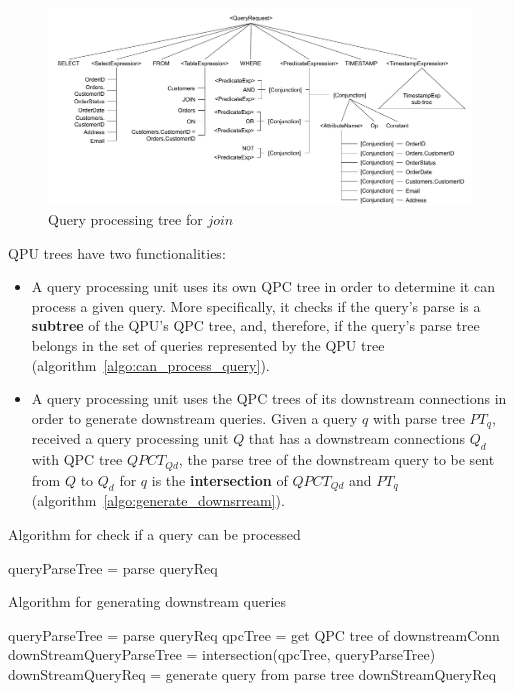 \begin{figure}[t]
  \centering
    \includegraphics[width=\textwidth]{./figures/design_pattern/qpt_join.pdf}
  \caption{Query processing tree for $join$}
  \label{fig:qpt_join}
\end{figure}

QPU trees have two functionalities:
\begin{itemize}
  \item A query processing unit uses its own QPC tree in order to determine it can process a given query.
  More specifically, it checks if the query's parse is a \textbf{subtree} of the QPU's QPC tree,
  and, therefore, if the query's parse tree belongs in the set of queries represented by the QPU tree
  (algorithm~\ref{algo:can_process_query}).

  \item A query processing unit uses the QPC trees of its downstream connections in order to generate downstream queries.
  Given a query $q$ with parse tree $PT_q$, received a query processing unit $Q$ that has a downstream connections $Q_d$
  with QPC tree $QPCT_{Qd}$, the parse tree of the downstream query to be sent from $Q$ to $Q_d$ for $q$ is the
  \textbf{intersection} of $QPCT_{Qd}$ and $PT_q$
  (algorithm~\ref{algo:generate_downsrream}).
\end{itemize}

\begin{algorithm}
\caption{Algorithm for check if a query can be processed}
\label{algo:can_process_query}
\begin{algorithmic}
\State queryParseTree = parse queryReq
\State {}
\EndFunction
\end{algorithmic}
\end{algorithm}

\begin{algorithm}
\caption{Algorithm for generating downstream queries}
\label{algo:generate_downsrream}
\begin{algorithmic}
\State queryParseTree = parse queryReq
\State qpcTree = get QPC tree of downstreamConn
\State downStreamQueryParseTree = intersection(qpcTree, queryParseTree)
\State downStreamQueryReq = generate query from parse tree
\State \Return downStreamQueryReq
\EndFunction
\end{algorithmic}
\end{algorithm}

